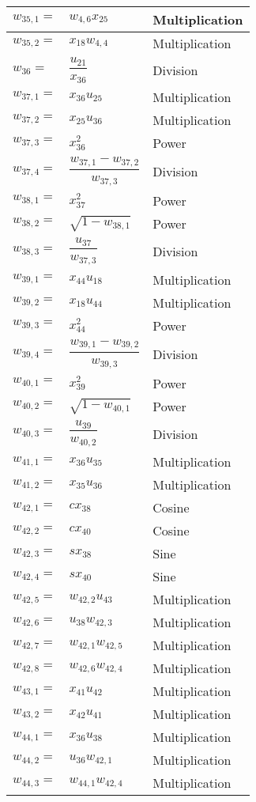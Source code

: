 \begin{longtable}{|p{1.5cm}|l|p{2cm}|}
$w_{35,1}=$ & $ w_{4,6}x_{25} $ & Multiplication \\ \hline 
$w_{35,2}=$ & $ x_{18}w_{4,4} $ & Multiplication \\ \hline 
$w_{36}=$ & $ \dfrac{u_{21}}{x_{36}} $ & Division \\ \hline 
$w_{37,1}=$ & $ x_{36}u_{25} $ & Multiplication \\ \hline 
$w_{37,2}=$ & $ x_{25}u_{36} $ & Multiplication \\ \hline 
$w_{37,3}=$ & $ x_{36}^{2} $ & Power \\ \hline 
$w_{37,4}=$ & $ \dfrac{w_{37,1}-w_{37,2}}{w_{37,3}} $ & Division \\ \hline 
$w_{38,1}=$ & $ x_{37}^{2} $ & Power \\ \hline 
$w_{38,2}=$ & $ \sqrt{1-w_{38,1}} $ & Power \\ \hline 
$w_{38,3}=$ & $ \dfrac{u_{37}}{w_{37,3}} $ & Division \\ \hline 
$w_{39,1}=$ & $ x_{44}u_{18} $ & Multiplication \\ \hline 
$w_{39,2}=$ & $ x_{18}u_{44} $ & Multiplication \\ \hline 
$w_{39,3}=$ & $ x_{44}^{2} $ & Power \\ \hline 
$w_{39,4}=$ & $ \dfrac{w_{39,1}-w_{39,2}}{w_{39,3}} $ & Division \\ \hline 
$w_{40,1}=$ & $ x_{39}^{2} $ & Power \\ \hline 
$w_{40,2}=$ & $ \sqrt{1-w_{40,1}} $ & Power \\ \hline 
$w_{40,3}=$ & $ \dfrac{u_{39}}{w_{40,2}} $ & Division \\ \hline 
$w_{41,1}=$ & $ x_{36}u_{35} $ & Multiplication \\ \hline 
$w_{41,2}=$ & $ x_{35}u_{36} $ & Multiplication \\ \hline 
$w_{42,1}=$ & $ cx_{38} $ & Cosine \\ \hline 
$w_{42,2}=$ & $ cx_{40} $ & Cosine \\ \hline 
$w_{42,3}=$ & $ sx_{38} $ & Sine \\ \hline 
$w_{42,4}=$ & $ sx_{40} $ & Sine \\ \hline 
$w_{42,5}=$ & $ w_{42,2}u_{43} $ & Multiplication \\ \hline 
$w_{42,6}=$ & $ u_{38}w_{42,3} $ & Multiplication\\ \hline 
$w_{42,7}=$ & $ w_{42,1}w_{42,5} $ & Multiplication \\ \hline 
$w_{42,8}=$ & $ w_{42,6}w_{42,4} $ & Multiplication \\ \hline 
$w_{43,1}=$ & $ x_{41}u_{42} $ & Multiplication \\ \hline 
$w_{43,2}=$ & $ x_{42}u_{41} $ & Multiplication \\ \hline 
$w_{44,1}=$ & $ x_{36}u_{38} $ & Multiplication \\ \hline
$w_{44,2}=$ & $ u_{36}w_{42,1} $ & Multiplication \\ \hline
$w_{44,3}=$ & $ w_{44,1}w_{42,4} $ & Multiplication \\ \hline
\end{longtable}

